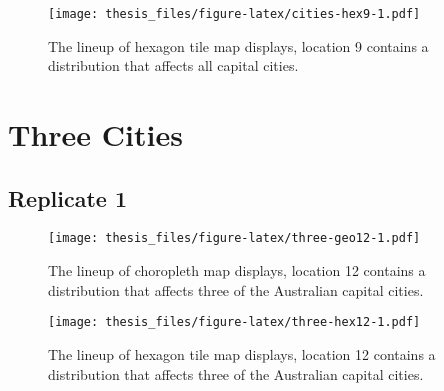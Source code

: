 \documentclass{monashthesis}
\begin{document}
\begin{figure}
\centering
\texttt{[image: thesis\_files/figure-latex/cities-hex9-1.pdf]}
\caption{\label{fig:cities-hex9}The lineup of hexagon tile map displays, location 9 contains a distribution that affects all capital cities.}
\end{figure}

\hypertarget{three-cities}{%
\section{Three Cities}\label{three-cities}}

\hypertarget{replicate-1-1}{%
\subsection{Replicate 1}\label{replicate-1-1}}

\begin{Shaded}
\begin{Highlighting}[]
\NormalTok{() }\OperatorTok{+}
\StringTok{  }\NormalTok{(}\NormalTok{(}\NormalTok{(}\NormalTok{)))}
\end{Highlighting}
\end{Shaded}

\begin{figure}
\centering
\texttt{[image: thesis\_files/figure-latex/three-geo12-1.pdf]}
\caption{\label{fig:three-geo12}The lineup of choropleth map displays, location 12 contains a distribution that affects three of the Australian capital cities.}
\end{figure}

\begin{Shaded}
\begin{Highlighting}[]
\NormalTok{() }\OperatorTok{+}
\StringTok{  }\NormalTok{(}\NormalTok{(}\NormalTok{(}\NormalTok{)))}
\end{Highlighting}
\end{Shaded}

\begin{figure}
\centering
\texttt{[image: thesis\_files/figure-latex/three-hex12-1.pdf]}
\caption{\label{fig:three-hex12}The lineup of hexagon tile map displays, location 12 contains a distribution that affects three of the Australian capital cities.}
\end{figure}
\end{document}
